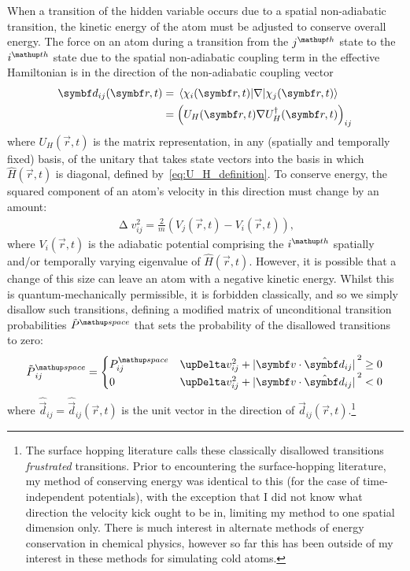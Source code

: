 When a transition of the hidden variable occurs due to a spatial non-adiabatic transition, the kinetic energy of the atom must be adjusted to conserve overall energy. The force on an atom during a transition from the $j^\up{th}$ state to the $i^\up{th}$ state due to the spatial non-adiabatic coupling term in the effective Hamiltonian is in the direction of the non-adiabatic coupling vector~\cite{doi:10.1146/annurev-physchem-040215-112245}
\begin{align}\label{eq:non_adiabatic_coupling_vector}
\vec d_{ij}(\vec r, t) &= \matrixel{\chi_i(\vec r, t)}{\nabla}{\chi_j(\vec r, t)}\\
&= \left(U_H(\vec r, t)\nabla U_H^\dagger(\vec r, t)\right)_{ij}
\end{align}
where $U_H(\vec r, t)$ is the matrix representation, in any (spatially and temporally fixed) basis, of the unitary that takes state vectors into the basis in which $\hat H(\vec r, t)$ is diagonal, defined by~\eqref{eq:U_H_definition}. To conserve energy, the squared component of an atom's velocity in this direction must change by an amount:
\begin{align}\label{eq:delta_v_squared}
\upDelta v_{ij}^2 = \frac2m\left(V_j(\vec r, t) - V_i(\vec r, t)\right),
\end{align}
where $V_i(\vec r, t)$ is the adiabatic potential comprising the $i^\up{th}$ spatially and/or temporally varying eigenvalue of $\hat H(\vec r, t)$. However, it is possible that a change of this size can leave an atom with a negative kinetic energy. Whilst this is quantum-mechanically permissible, it is forbidden classically, and so we simply disallow such transitions, defining a modified matrix of unconditional transition probabilities $\tilde P^\up{space}$ that sets the probability of the disallowed transitions to zero:
\begin{align}\label{eq:tilde_P_space}
\tilde P^\up{space}_{ij} =
\begin{cases}
P^\up{space}_{ij} & \upDelta v_{ij}^2 + \abs{\vec v\cdot\hat{\vec d}_{ij}}^2 \geq 0 \\
0 & \upDelta v_{ij}^2 + \abs{\vec v\cdot\hat{\vec d}_{ij}}^2 < 0
\end{cases}
\end{align}
where $\hat{\vec d}_{ij} = \hat{\vec d}_{ij}(\vec r, t)$ is the unit vector in the direction of $\vec d_{ij}(\vec r, t)$.\footnote{The surface hopping literature calls these classically disallowed transitions \emph{frustrated} transitions. Prior to encountering the surface-hopping literature, my method of conserving energy was identical to this (for the case of time-independent potentials), with the exception that I did not know what direction the velocity kick ought to be in, limiting my method to one spatial dimension only. There is much interest in alternate methods of energy conservation in chemical physics, however so far this has been outside of my interest in these methods for simulating cold atoms.}

